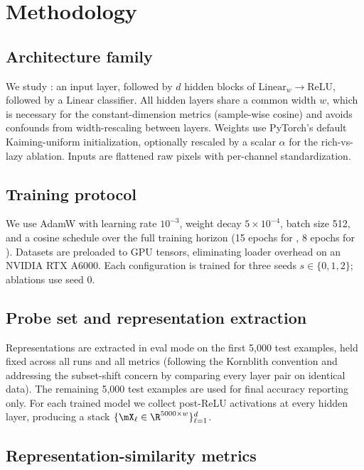 \section{Methodology}
\label{sec:methodology}

\subsection{Architecture family}

We study : an input layer, followed by $d$ hidden blocks of $\mathrm{Linear}_w \to \mathrm{ReLU}$, followed by a $\mathrm{Linear}$ classifier. All hidden layers share a common width $w$, which is necessary for the constant-dimension metrics (sample-wise cosine) and avoids confounds from width-rescaling between layers. Weights use PyTorch's default Kaiming-uniform initialization, optionally rescaled by a scalar $\alpha$ for the rich-vs-lazy ablation. Inputs are flattened raw pixels with per-channel standardization.

\subsection{Training protocol}

We use AdamW with learning rate $10^{-3}$, weight decay $5\times 10^{-4}$, batch size 512, and a cosine schedule over the full training horizon (15 epochs for \cifar, 8 epochs for \mnist). Datasets are preloaded to GPU tensors, eliminating loader overhead on an NVIDIA RTX A6000. Each configuration is trained for three seeds $s\!\in\!\{0,1,2\}$; ablations use seed 0.

\subsection{Probe set and representation extraction}

Representations are extracted in eval mode on the first 5{,}000 test examples, held fixed across all runs and all metrics (following the Kornblith convention and addressing the \citet{davari2022reliability} subset-shift concern by comparing every layer pair on identical data). The remaining 5{,}000 test examples are used for final accuracy reporting only. For each trained model we collect post-ReLU activations at every hidden layer, producing a stack $\{\mX_\ell \in \R^{5000 \times w}\}_{\ell=1}^{d}$.

\subsection{Representation-similarity metrics}

